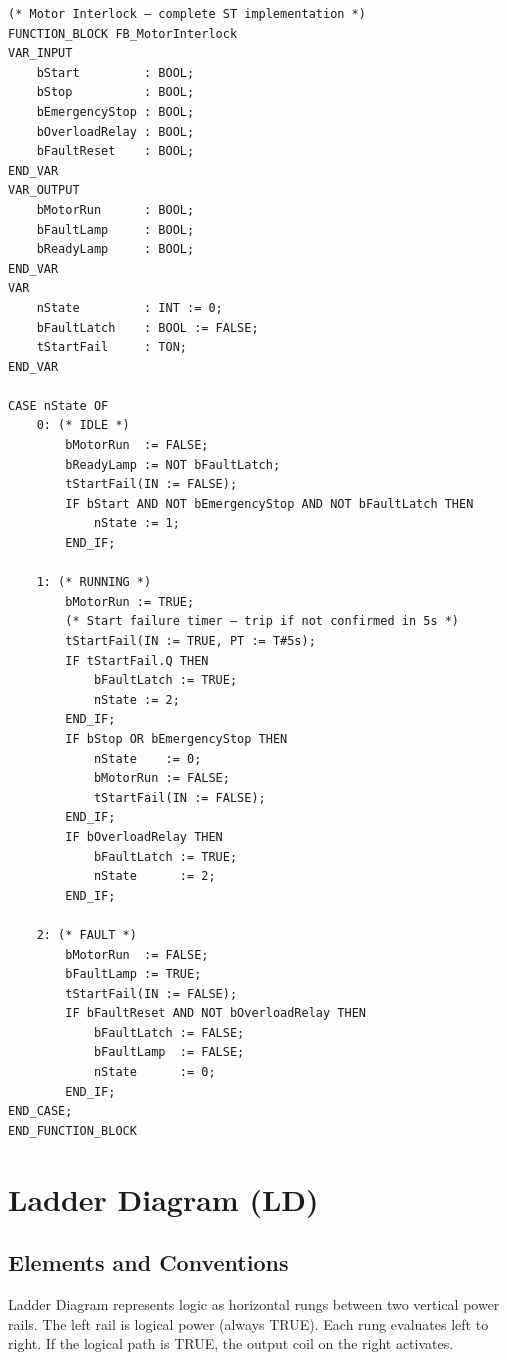 \documentclass[12pt,twoside,openright]{memoir}
\begin{document}
\begin{lstlisting}
(* Motor Interlock — complete ST implementation *)
FUNCTION_BLOCK FB_MotorInterlock
VAR_INPUT
    bStart         : BOOL;
    bStop          : BOOL;
    bEmergencyStop : BOOL;
    bOverloadRelay : BOOL;
    bFaultReset    : BOOL;
END_VAR
VAR_OUTPUT
    bMotorRun      : BOOL;
    bFaultLamp     : BOOL;
    bReadyLamp     : BOOL;
END_VAR
VAR
    nState         : INT := 0;
    bFaultLatch    : BOOL := FALSE;
    tStartFail     : TON;
END_VAR

CASE nState OF
    0: (* IDLE *)
        bMotorRun  := FALSE;
        bReadyLamp := NOT bFaultLatch;
        tStartFail(IN := FALSE);
        IF bStart AND NOT bEmergencyStop AND NOT bFaultLatch THEN
            nState := 1;
        END_IF;

    1: (* RUNNING *)
        bMotorRun := TRUE;
        (* Start failure timer — trip if not confirmed in 5s *)
        tStartFail(IN := TRUE, PT := T#5s);
        IF tStartFail.Q THEN
            bFaultLatch := TRUE;
            nState := 2;
        END_IF;
        IF bStop OR bEmergencyStop THEN
            nState    := 0;
            bMotorRun := FALSE;
            tStartFail(IN := FALSE);
        END_IF;
        IF bOverloadRelay THEN
            bFaultLatch := TRUE;
            nState      := 2;
        END_IF;

    2: (* FAULT *)
        bMotorRun  := FALSE;
        bFaultLamp := TRUE;
        tStartFail(IN := FALSE);
        IF bFaultReset AND NOT bOverloadRelay THEN
            bFaultLatch := FALSE;
            bFaultLamp  := FALSE;
            nState      := 0;
        END_IF;
END_CASE;
END_FUNCTION_BLOCK
\end{lstlisting}

\chapter{Ladder Diagram (LD)}

\section{Elements and Conventions}

Ladder Diagram represents logic as horizontal rungs between two vertical power rails. The left rail is logical power (always TRUE). Each rung evaluates left to right. If the logical path is TRUE, the output coil on the right activates.
\end{document}
